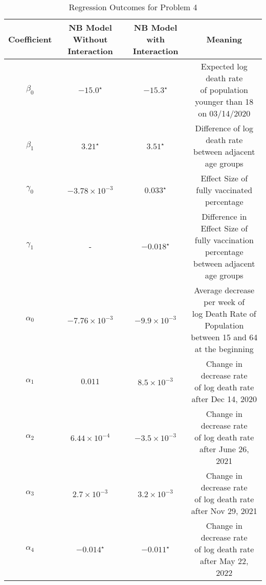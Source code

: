 \documentclass[12pt]{article}
\begin{document}
\begin{enumerate}[(a)]
	\begin{table}[htbp]
		\centering
		\begin{tabular}{cccc}
			\toprule
			Coefficient & \makecell{NB Model \\ Without Interaction} & \makecell{NB Model \\ with Interaction } &  Meaning\\
			\midrule
			$\beta_{0}$ & $-15.0^\star$ & $-15.3^\star$ & \makecell{Expected log death rate \\of population younger than 18\\ on 03/14/2020 }\\
			\addlinespace[0.2cm]
			$\beta_{1}$ & $3.21^\star$ & $3.51^\star$ &  \makecell{Difference of log death rate \\between adjacent age groups}\\
			\addlinespace[0.2cm]
			$\gamma_{0}$ & $-3.78\times 10^{-3}$ & $0.033^\star$ &  \makecell{Effect Size of \\fully vaccinated percentage}\\
			\addlinespace[0.2cm]
			$\gamma_{1}$ & - & $-0.018^\star$ &  \makecell{Difference in Effect Size of \\fully vaccination percentage \\ between adjacent age groups}\\
			\addlinespace[0.2cm] 
			$\alpha_{0}$ & $-7.76\times 10^{-3}$ & $-9.9\times 10^{-3}$ &   \makecell{Average decrease per week of \\ log Death Rate of  Population \\ between 15 and 64 \\ at the beginning}\\
			\addlinespace[0.2cm]
			$\alpha_{1}$ & $0.011$ & $8.5\times 10^{-3}$ &  \makecell{Change in decrease rate \\ of log death rate\\ after Dec 14, 2020}\\
			\addlinespace[0.2cm]
			$\alpha_{2}$ & $6.44\times 10^{-4}$ & $-3.5\times 10^{-3}$ &  \makecell{Change in decrease rate \\ of log death rate\\ after June 26, 2021}\\
			\addlinespace[0.2cm]
			$\alpha_{3}$ & $2.7\times 10^{-3}$ & $3.2\times 10^{-3}$ & \makecell{Change in decrease rate \\ of log death rate\\ after Nov 29, 2021}\\
			\addlinespace[0.2cm]
			$\alpha_{4}$ & $-0.014^\star$ & $-0.011^\star$ &  \makecell{Change in decrease rate \\ of log death rate\\ after May 22, 2022}\\
			
			\bottomrule
		\end{tabular}
		\caption{Regression Outcomes for Problem 4}\label{P4table}
	\end{table}	
\end{enumerate}
\end{document}
